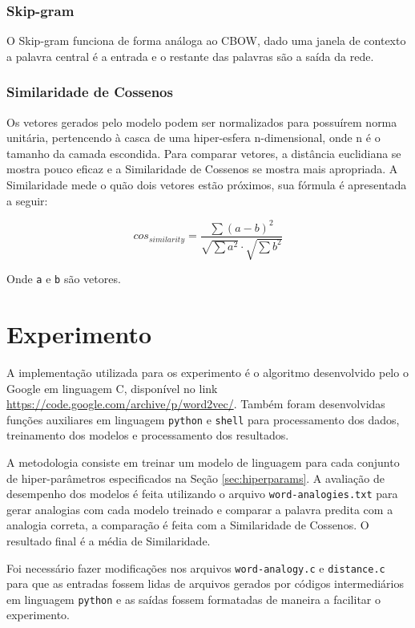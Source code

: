 \documentclass[11pt]{scrartcl} %
\begin{document}
\subsubsection{Skip-gram}\label{sec:skipgram}

O Skip-gram funciona de forma análoga ao CBOW, dado uma janela de contexto a palavra central é a entrada e o restante das palavras são a saída da rede.
\subsubsection{Similaridade de Cossenos}

Os vetores gerados pelo modelo podem ser normalizados para possuírem norma unitária, pertencendo à casca de uma hiper-esfera n-dimensional, onde n é o tamanho da camada escondida. Para comparar vetores, a distância euclidiana se mostra pouco eficaz e a Similaridade de Cossenos se mostra mais apropriada. A Similaridade mede o quão dois vetores estão próximos, sua fórmula é apresentada a seguir:

\begin{equation}
cos_{similarity} = \frac{\sum{(a-b)^{2}}}{\sqrt{\sum{a^{2}}}\cdot\sqrt{\sum{b^{2}}}}
\end{equation}

Onde \texttt{a} e \texttt{b} são vetores. 	
	
\section{Experimento}

A implementação utilizada para os experimento é o algoritmo desenvolvido pelo o Google em linguagem C, disponível no link \hyperlink{Word2Vec(Google)}{https://code.google.com/archive/p/word2vec/}. Também foram desenvolvidas funções auxiliares em linguagem \texttt{python} e \texttt{shell} para processamento dos dados, treinamento dos modelos e processamento dos resultados.

A metodologia consiste em treinar um modelo de linguagem para cada conjunto de hiper-parâmetros especificados na Seção \ref{sec:hiperparams}. A avaliação de desempenho dos modelos é feita utilizando o arquivo \texttt{word-analogies.txt} para gerar analogias com cada modelo treinado e comparar a palavra predita com a analogia correta, a comparação é feita com a Similaridade de Cossenos. O resultado final é a média de Similaridade.

Foi necessário fazer modificações nos arquivos \texttt{word-analogy.c} e \texttt{distance.c} para que as entradas fossem lidas de arquivos gerados por códigos intermediários em linguagem \texttt{python} e as saídas fossem formatadas de maneira a facilitar o experimento.
\end{document}
